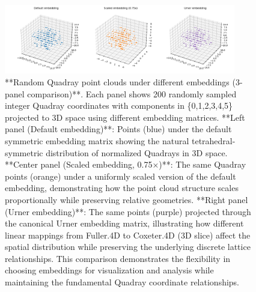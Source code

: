 \documentclass[
  10pt,
]{article}
\begin{document}
\begin{figure}[htbp]
\centering
\includegraphics[width=0.9\textwidth]{figures/quadray_clouds.png}
\caption{**Random Quadray point clouds under different embeddings (3-panel comparison)**. Each panel shows 200 randomly sampled integer Quadray coordinates with components in \{0,1,2,3,4,5\} projected to 3D space using different embedding matrices. **Left panel (Default embedding)**: Points (blue) under the default symmetric embedding matrix showing the natural tetrahedral-symmetric distribution of normalized Quadrays in 3D space. **Center panel (Scaled embedding, 0.75×)**: The same Quadray points (orange) under a uniformly scaled version of the default embedding, demonstrating how the point cloud structure scales proportionally while preserving relative geometries. **Right panel (Urner embedding)**: The same points (purple) projected through the canonical Urner embedding matrix, illustrating how different linear mappings from Fuller.4D to Coxeter.4D (3D slice) affect the spatial distribution while preserving the underlying discrete lattice relationships. This comparison demonstrates the flexibility in choosing embeddings for visualization and analysis while maintaining the fundamental Quadray coordinate relationships.}
\label{fig:quadray_clouds}
\end{figure}
\end{document}
